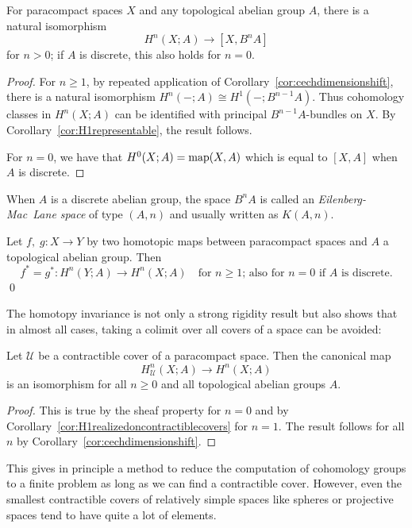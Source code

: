 \documentclass[a4paper,openany]{scrbook}
\begin{document}
\begin{corollary}\label{cor:cohomologyrepresentable}
For paracompact spaces $X$ and any topological abelian group $A$, there is a natural isomorphism
\[
H^n(X;A) \to [X,B^nA]
\]
for $n>0$; if $A$ is discrete, this also holds for $n=0$.
\end{corollary}
\begin{proof}
For $n\geq 1$, by repeated application of Corollary~\ref{cor:cechdimensionshift}, there is a natural isomorphism $H^n(-;A) \cong H^1(-;B^{n-1}A)$. Thus cohomology classes in $H^n(X;A)$ can be identified with principal $B^{n-1}A$-bundles on $X$. By Corollary~\ref{cor:H1representable}, the result follows.

For $n=0$, we have that $H^0(X;A) = \operatorname{map}(X,A)$ which is equal to $[X,A]$ when $A$ is discrete.
\end{proof}

\begin{defn}
When $A$ is a discrete abelian group, the space $B^nA$ is called an \emph{Eilenberg-Mac~Lane space} of type $(A,n)$ and usually written as $K(A,n)$.
\end{defn}

\begin{corollary}\label{cor:cechcohomologyhomotopyinvariance}
Let $f,\;g\colon X \to Y$ by two homotopic maps between paracompact spaces and $A$ a topological abelian group. Then
\[
f^*=g^*\colon H^n(Y;A) \to H^n(X;A) \quad \text{for $n\geq 1$; also for $n=0$ if $A$ is discrete.}
\] \qed 
\end{corollary}


The homotopy invariance is not only a strong rigidity result but also shows that in almost all cases, taking a colimit over all covers of a space can be avoided:

\begin{thm}\label{thm:contractible-covers}
Let $\mathcal U$ be a contractible cover of a paracompact space. Then the canonical map
\[
H^n_{\mathcal U}(X;A) \to H^n(X;A) 
\]
is an isomorphism for all $n \geq 0$ and all topological abelian groups $A$.
\end{thm}
\begin{proof}
This is true by the sheaf property for $n=0$ and by Corollary~\ref{cor:H1realizedoncontractiblecovers} for $n=1$. The result follows for all $n$ by Corollary~\ref{cor:cechdimensionshift}. 
\end{proof}

This gives in principle a method to reduce the computation of cohomology groups to a finite problem as long as we can find a contractible cover. However, even the smallest contractible covers of relatively simple spaces like spheres or projective spaces tend to have quite a lot of elements.
\end{document}
